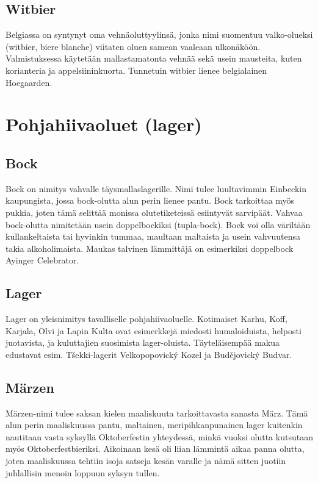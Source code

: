 \documentclass[a4paper,11pt]{report}
\begin{document}
\subsection*{Witbier}

Belgiassa on syntynyt oma vehnäoluttyylinsä, jonka nimi suomentuu valko-olueksi (witbier, biere blanche) viitaten oluen samean vaaleaan ulkonäköön. Valmistuksessa käytetään mallastamatonta vehnää sekä usein mausteita, kuten korianteria ja appelsiininkuorta. Tunnetuin witbier lienee belgialainen Hoegaarden.

\section{Pohjahiivaoluet (lager)}

\subsection*{Bock}

Bock on nimitys vahvalle täysmallaslagerille. Nimi tulee luultavimmin Einbeckin kaupungista, jossa bock-olutta alun perin lienee pantu. Bock tarkoittaa myös pukkia, joten tämä selittää monissa olutetiketeissä esiintyvät sarvipäät. Vahvaa bock-olutta nimitetään usein doppelbockiksi (tupla-bock). Bock voi olla väriltään kullankeltaista tai hyvinkin tummaa, maultaan maltaista ja usein vahvuutensa takia alkoholimaista. Maukas talvinen lämmittäjä on esimerkiksi doppelbock Ayinger Celebrator.

\subsection*{Lager}

Lager on yleisnimitys tavalliselle pohjahiivaoluelle. Kotimaiset Karhu, Koff, Karjala, Olvi ja Lapin Kulta ovat esimerkkejä miedosti humaloiduista, helposti juotavista, ja kuluttajien suosimista lager-oluista. Täyteläisempää makua edustavat esim. Tšekki-lagerit Velkopopovický  Kozel ja Budějovický Budvar.


\subsection*{Märzen}

Märzen-nimi tulee saksan kielen maaliskuuta tarkoittavasta sanasta März. Tämä alun perin maaliskuussa pantu, maltainen, meripihkanpunainen lager kuitenkin nautitaan vasta syksyllä Oktoberfestin yhteydessä, minkä vuoksi olutta kutsutaan myös Oktoberfestbieriksi. Aikoinaan kesä oli liian lämmintä aikaa panna olutta, joten maaliskuussa tehtiin isoja satseja kesän varalle ja nämä sitten juotiin juhlallisin menoin loppuun syksyn tullen.
\end{document}

